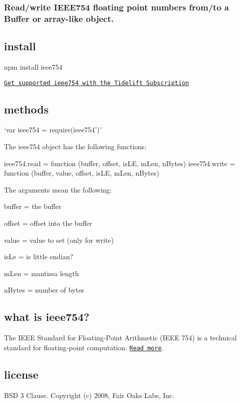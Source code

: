 \href{https://saucelabs.com/u/ieee754}{\tt }

\subsubsection*{Read/write I\+E\+E\+E754 floating point numbers from/to a Buffer or array-\/like object.}

\subsection*{install}


\begin{DoxyCode}
npm install ieee754
\end{DoxyCode}


\href{https://tidelift.com/subscription/pkg/npm-ieee754?utm_source=npm-ieee754&utm_medium=referral&utm_campaign=readme}{\tt Get supported ieee754 with the Tidelift Subscription}

\subsection*{methods}

`var ieee754 = require(\textquotesingle{}ieee754')\`{}

The {\ttfamily ieee754} object has the following functions\+:


\begin{DoxyCode}
ieee754.read = function (buffer, offset, isLE, mLen, nBytes)
ieee754.write = function (buffer, value, offset, isLE, mLen, nBytes)
\end{DoxyCode}


The arguments mean the following\+:


\begin{DoxyItemize}
\item buffer = the buffer
\item offset = offset into the buffer
\item value = value to set (only for {\ttfamily write})
\item is\+Le = is little endian?
\item m\+Len = mantissa length
\item n\+Bytes = number of bytes
\end{DoxyItemize}

\subsection*{what is ieee754?}

The I\+E\+EE Standard for Floating-\/\+Point Arithmetic (I\+E\+EE 754) is a technical standard for floating-\/point computation. \href{http://en.wikipedia.org/wiki/IEEE_floating_point}{\tt Read more}.

\subsection*{license}

B\+SD 3 Clause. Copyright (c) 2008, Fair Oaks Labs, Inc. 